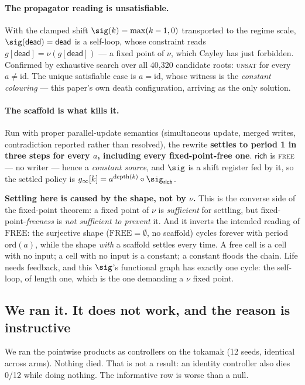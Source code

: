 \paragraph{The propagator reading is unsatisfiable.}
With the clamped shift $\sig(k) = \max(k-1,0)$ transported to the regime scale,
$\sig(\textsf{dead}) = \textsf{dead}$ is a self-loop, whose constraint reads
$g[\textsf{dead}] = \nu(g[\textsf{dead}])$ --- a fixed point of $\nu$, which Cayley
has just forbidden. Confirmed by exhaustive search over all 40{,}320 candidate
roots: \textsc{unsat} for every $a \neq \mathrm{id}$. The unique satisfiable case
is $a = \mathrm{id}$, whose witness is the \emph{constant colouring} --- this
paper's own death configuration, arriving as the only solution.

\paragraph{The scaffold is what kills it.}
Run with proper parallel-update semantics (simultaneous update, merged writes,
contradiction reported rather than resolved), the rewrite \textbf{settles to
period 1 in three steps for every $a$, including every fixed-point-free one}.
$\textsf{rich}$ is \textsc{free} --- no writer --- hence a \emph{constant source},
and $\sig$ is a shift register fed by it, so the settled policy is
$g_\infty[k] = a^{\mathrm{depth}(k)} \circ \sig_{\textsf{rich}}$.

\textbf{Settling here is caused by the shape, not by $\nu$.} This is the converse
side of the fixed-point theorem: a fixed point of $\nu$ is \emph{sufficient} for
settling, but fixed-point-\emph{freeness} is \emph{not sufficient to prevent} it.
And it inverts the intended reading of $\mathrm{FREE}$: the surjective shape
($\mathrm{FREE} = \emptyset$, no scaffold) cycles forever with period
$\mathrm{ord}(a)$, while the shape \emph{with} a scaffold settles every time. A
free cell is a cell with no input; a cell with no input is a constant; a constant
floods the chain. Life needs feedback, and this $\sig$'s functional graph has
exactly one cycle: the self-loop, of length one, which is the one demanding a
$\nu$ fixed point.

\subsection{We ran it. It does not work, and the reason is instructive}

We ran the pointwise products as controllers on the tokamak (12 seeds, identical
across arms). Nothing died. That is not a result: an identity controller also
dies 0/12 while doing nothing. The informative row is worse than a null.

